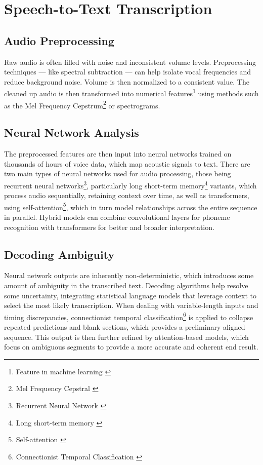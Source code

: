 \section{Speech-to-Text Transcription}

\subsection{Audio Preprocessing}
Raw audio is often filled with noise and inconsistent volume levels.
Preprocessing techniques --- like spectral subtraction --- can help isolate vocal frequencies and reduce background noise.
Volume is then normalized to a consistent value.
The cleaned up audio is then transformed into numerical features\footnote{Feature in machine learning \cite{feature}}
using methods such as the Mel Frequency Cepstrum\footnote{Mel Frequency Cepstral \cite{mfc}} or spectrograms.

\subsection{Neural Network Analysis}
The preprocessed features are then input into neural networks trained on thousands of hours of voice data,
which map acoustic signals to text.
There are two main types of neural networks used for audio processing,
those being recurrent neural networks\footnote{Recurrent Neural Network \cite{rnn}},
particularly long short-term memory\footnote{Long short-term memory \cite{lstm}} variants,
which process audio sequentially, retaining context over time,
as well as transformers, using self-attention\footnote{Self-attention \cite{self-attention}},
which in turn model relationships across the entire sequence in parallel.
Hybrid models can combine convolutional layers for phoneme recognition with transformers for better and broader interpretation.

\subsection{Decoding Ambiguity}
Neural network outputs are inherently non-deterministic, which introduces some amount of ambiguity in the transcribed text.
Decoding algorithms help resolve some uncertainty, integrating statistical language models
that leverage context to select the most likely transcription.
When dealing with variable-length inputs and timing discrepancies,
connectionist temporal classification\footnote{Connectionist Temporal Classification \cite{ctc}}
is applied to collapse repeated predictions and blank sections, which provides a preliminary aligned sequence.
This output is then further refined by attention-based models,
which focus on ambiguous segments to provide a more accurate and coherent end result.

